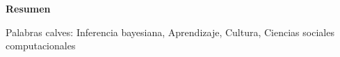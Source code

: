 \documentclass[a4paper,10pt]{book}
\theoremstyle{definition}1
\begin{document}
\hspace{2cm}

\begin{center}
\textbf{Resumen}
\end{center}



\vspace{0.3cm}

\noindent Palabras calves: Inferencia bayesiana, Aprendizaje, Cultura, Ciencias sociales computacionales




\tableofcontents

\newpage 

\vfill
% 
% 
% 
% 
\end{document}
